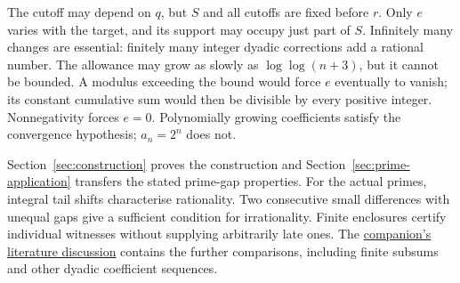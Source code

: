 \documentclass[11pt]{article}
\begin{document}
The cutoff may depend on $q$, but $S$ and all cutoffs are fixed before
$r$.  Only $e$ varies with the target, and its support may occupy just
part of $S$.  Infinitely many changes are essential: finitely many
integer dyadic corrections add a rational number.  The allowance may
grow as slowly as $\log\log(n+3)$, but it cannot be bounded.  A modulus
exceeding the bound would force $e$ eventually to vanish; its constant
cumulative sum would then be divisible by every positive integer.
Nonnegativity forces $e=0$.  Polynomially growing coefficients satisfy
the convergence hypothesis; $a_n=2^n$ does not.

Section~\ref{sec:construction} proves the construction and
Section~\ref{sec:prime-application} transfers the stated prime-gap properties.
For the actual primes, integral tail shifts characterise rationality.
Two consecutive small differences with unequal gaps give a sufficient
condition for irrationality.  Finite enclosures certify individual
witnesses without supplying arbitrarily late ones.  The
\href{erdos251-prime-gap-reasoning-surface.pdf\#context}{companion's literature discussion}
contains the further comparisons, including finite subsums and other
dyadic coefficient sequences.
\end{document}
